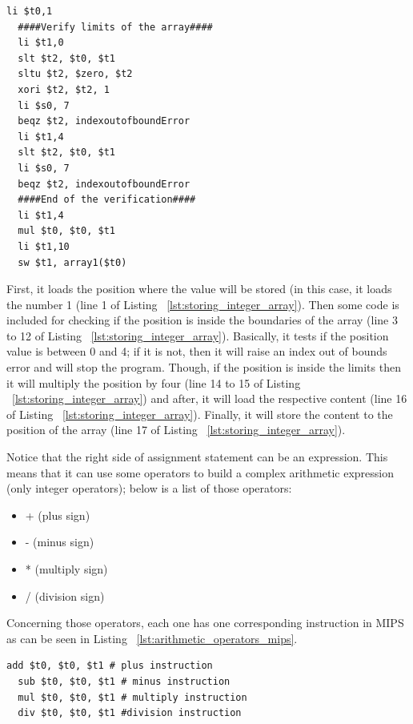\documentclass[
  oneside,
  11pt, a4paper,
  footinclude=true,
  headinclude=true,
  cleardoublepage=empty
]{scrbook}
\begin{document}
\begin{lstlisting}[caption={Code generated for line 3 in Listing ~\ref{lst:cases_assignment_liss}},label={lst:storing_integer_array}]
  li $t0,1		
  ####Verify limits of the array####
  li $t1,0		
  slt $t2, $t0, $t1	
  sltu $t2, $zero, $t2	
  xori $t2, $t2, 1	
  li $s0, 7	
  beqz $t2, indexoutofboundError	
  li $t1,4		
  slt $t2, $t0, $t1	
  li $s0, 7	
  beqz $t2, indexoutofboundError	
  ####End of the verification####
  li $t1,4		
  mul $t0, $t0, $t1	
  li $t1,10		
  sw $t1, array1($t0)		
\end{lstlisting}

First, it loads the position where the value will be stored (in this case, it loads the number 1 (line 1 of Listing ~\ref{lst:storing_integer_array}).
Then some code is included for checking if the position is inside the boundaries of the array (line 3 to 12 of Listing ~\ref{lst:storing_integer_array}). Basically, it tests if the position value is between 0 and 4; if it is not, then it will raise an index out of bounds error and will stop the program.
Though, if the position is inside the limits then it will multiply the position by four (line 14 to 15 of Listing ~\ref{lst:storing_integer_array}) and after, it will load the respective content (line 16 of Listing ~\ref{lst:storing_integer_array}). Finally, it will store the content to the position of the array (line 17 of Listing ~\ref{lst:storing_integer_array}).

Notice that the right side of assignment statement can be an expression. This means that it can use some operators to build a  complex arithmetic expression (only integer operators); below is a list of those operators:

\begin{itemize}
\item + (plus sign)
\item - (minus sign)
\item * (multiply sign)
\item / (division sign)
\end{itemize}

Concerning those operators, each one has one corresponding instruction in MIPS as can be seen in Listing ~\ref{lst:arithmetic_operators_mips}.

\begin{lstlisting}[caption={Code generated for arithmetic operators},label={lst:arithmetic_operators_mips}]
  add $t0, $t0, $t1 # plus instruction
  sub $t0, $t0, $t1 # minus instruction
  mul $t0, $t0, $t1 # multiply instruction
  div $t0, $t0, $t1 #division instruction
\end{lstlisting}
\end{document}
